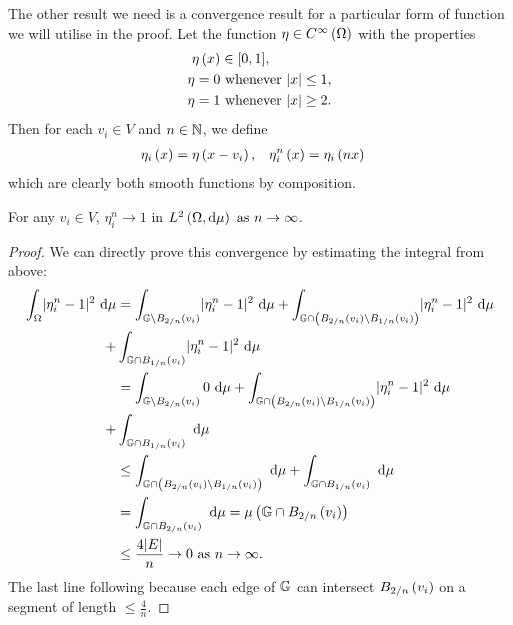 The other result we need is a convergence result for a particular form of function we will utilise in the proof.
Let the function $\eta\in C^{\infty}\left( \Omega \right)$ with the properties
\begin{align*}
	\eta\left( x \right) &\in [0,1], \\
	\eta = 0 &\text{ whenever } \lvert x \rvert\leq 1, \\
	\eta = 1 &\text{ whenever } \lvert x \rvert\geq 2.
\end{align*}
Then for each $v_i\in V$ and $n\in\mathbb{N}$, we define
\begin{align*}
	\eta_i\left( x \right) = \eta\left( x-v_i \right), &\quad \eta_i^n\left( x \right) = \eta_i\left( nx \right)
\end{align*}
which are clearly both smooth functions by composition.
\begin{lemma} \label{lem:etaConv}
	For any $v_i\in V$, $\eta_i^n \rightarrow 1$ in $L^{2}\left( \Omega,\mathrm{d}\mu \right) \ \text{as} \ n \rightarrow\infty$.
\end{lemma}
\begin{proof}
	We can directly prove this convergence by estimating the integral from above:
	\begin{align*}
		\begin{split}
			\int_{\Omega}\lvert \eta_i^n-1 \rvert^2 \ \mathrm{d}\mu &= \int_{\mathbb{G}\setminus B_{2/n}\left( v_{i} \right)}\lvert \eta_{i}^{n}-1 \rvert^{2} \ \mathrm{d}\mu + \int_{\mathbb{G} \cap \left( B_{2/n}\left( v_{i} \right) \setminus B_{1/n}\left( v_{i} \right) \right)}\lvert \eta_{i}^{n}-1 \rvert^{2} \ \mathrm{d}\mu \\ + &\int_{\mathbb{G}\cap B_{1/n}\left( v_{i} \right)}\lvert \eta_{i}^{n}-1 \rvert^{2} \ \mathrm{d}\mu \\
			&= \int_{\mathbb{G}\setminus B_{2/n}\left( v_{i} \right)}0 \ \mathrm{d}\mu + \int_{\mathbb{G} \cap \left( B_{2/n}\left( v_{i} \right) \setminus B_{1/n}\left( v_{i} \right) \right)}\lvert \eta_{i}^{n}-1 \rvert^{2} \ \mathrm{d}\mu \\ + &\int_{\mathbb{G}\cap B_{1/n}\left( v_{i} \right)} \ \mathrm{d}\mu \\
			&\leq \int_{\mathbb{G} \cap \left( B_{2/n}\left( v_{i} \right) \setminus B_{1/n}\left( v_{i} \right) \right)} \ \mathrm{d}\mu + \int_{\mathbb{G}\cap B_{1/n}\left( v_{i} \right)} \ \mathrm{d}\mu \\
			&=\int_{\mathbb{G}\cap B_{2/n}\left( v_{i} \right)} \ \mathrm{d}\mu = \mu\left( \mathbb{G}\cap B_{2/n}\left( v_{i} \right) \right) \\
			&\leq \frac{4 \lvert E \rvert}{n} \rightarrow0 \ \text{as} \ n \rightarrow\infty.
		\end{split}
	\end{align*}
	The last line following because each edge of $\mathbb{G}$ can intersect $B_{2/n}\left( v_i \right)$ on a segment of length $\leq\frac{4}{n}$.
\end{proof}


